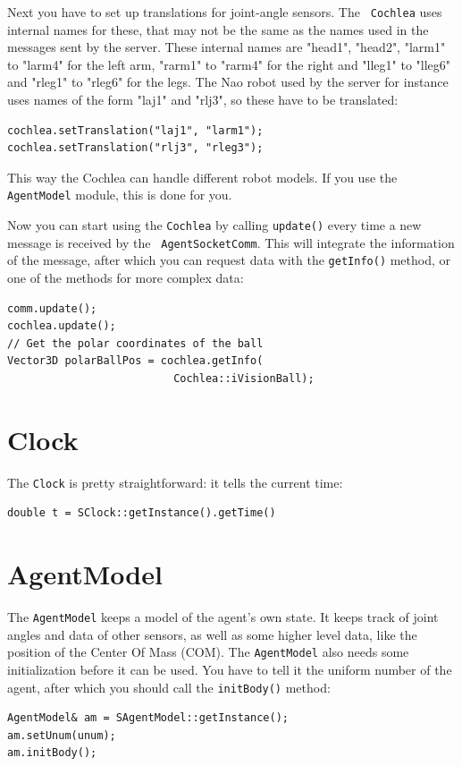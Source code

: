 Next you have to set up translations for joint-angle sensors. The {\tt
  Cochlea} uses internal names for these, that may not be the same as
the names used in the messages sent by the server. These internal
names are "head1", "head2", "larm1" to "larm4" for the left arm,
"rarm1" to "rarm4" for the right and "lleg1" to "lleg6" and "rleg1" to
"rleg6" for the legs. The Nao robot used by the server for instance
uses names of the form "laj1" and "rlj3", so these have to be
translated:
\begin{lstlisting}[frame=single]
cochlea.setTranslation("laj1", "larm1");
cochlea.setTranslation("rlj3", "rleg3");
\end{lstlisting}
This way the Cochlea can handle different robot models. If you use the
{\tt AgentModel} module, this is done for you.

Now you can start using the {\tt Cochlea} by calling {\tt update()}
every time a new message is received by the {\tt
  AgentSocketComm}. This will integrate the information of the
message, after which you can request data with the {\tt getInfo()}
method, or one of the methods for more complex data:
\begin{lstlisting}[frame=single]
comm.update();
cochlea.update();
// Get the polar coordinates of the ball
Vector3D polarBallPos = cochlea.getInfo(
                          Cochlea::iVisionBall);
\end{lstlisting}

\section{Clock}
\label{secClock}

The {\tt Clock} is pretty straightforward: it tells the current time:
\begin{lstlisting}[frame=single]
double t = SClock::getInstance().getTime()
\end{lstlisting}

\section{AgentModel}
\label{secAgentModel}

The {\tt AgentModel} keeps a model of the agent's own state. It
keeps track of joint angles and data of other sensors, as well as some
higher level data, like the position of the Center Of Mass (COM). The
{\tt AgentModel} also needs some initialization before it can be
used. You have to tell it the uniform number of the agent, after which
you should call the {\tt initBody()} method:
\begin{lstlisting}[frame=single]
AgentModel& am = SAgentModel::getInstance();
am.setUnum(unum);
am.initBody();
\end{lstlisting}

